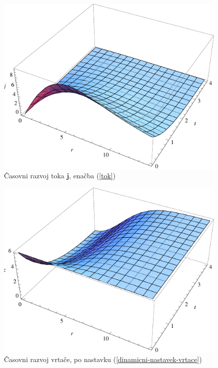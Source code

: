 \documentclass[a4paper, oneside, 12pt]{book}
\begin{document}
      \begin{figure}[H]
        \begin{center}
          \includegraphics[width=14cm]{slike/tok-dinamicno}
        \end{center}
        \caption{Časovni razvoj toka $\mathbf{j}$, enačba (\ref{tok})}
        \label{fig:tok-dinamicno}
      \end{figure}

      \begin{figure}[H]
        \begin{center}
          \includegraphics[width=14cm]{slike/vrtaca-dinamicno}
        \end{center}
        \caption{Časovni razvoj vrtače, po nastavku (\ref{dinamicni-nastavek-vrtace})}
        \label{fig:vrtaca-dinamicno}
      \end{figure}
\end{document}
